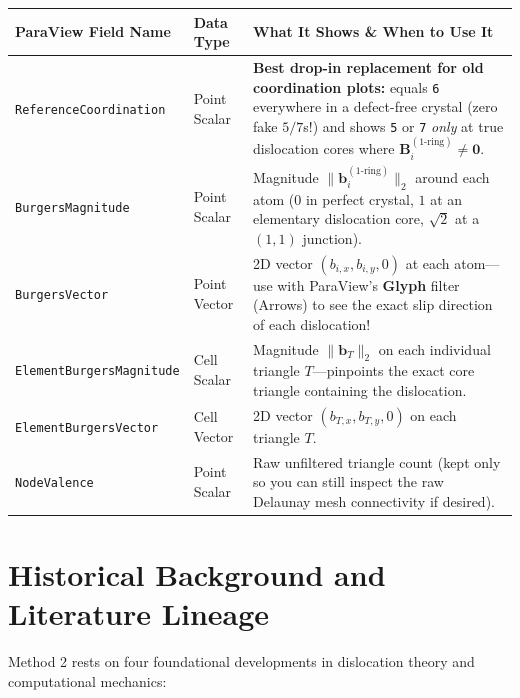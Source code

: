 \documentclass[11pt,a4paper]{article}
\newcommand{\code}[1]{\texttt{#1}}
\begin{document}
\begin{table}[htbp]
  \centering
  \small
  \renewcommand{\arraystretch}{1.25}
  \begin{tabular}{@{}llp{8.2cm}@{}}
    \toprule
    \textbf{ParaView Field Name} & \textbf{Data Type} & \textbf{What It Shows \& When to Use It} \\
    \midrule
    \code{ReferenceCoordination} & Point Scalar & \textbf{Best drop-in replacement for old coordination plots:} equals \code{6} everywhere in a defect-free crystal (zero fake $5/7$s!) and shows \code{5} or \code{7} \emph{only} at true dislocation cores where $\bm{B}_i^{(1\text{-ring})} \neq \bm{0}$. \\
    \code{BurgersMagnitude} & Point Scalar & Magnitude $\|\bm{b}_i^{(1\text{-ring})}\|_2$ around each atom ($0$ in perfect crystal, $1$ at an elementary dislocation core, $\sqrt{2}$ at a $(1,1)$ junction). \\
    \code{BurgersVector} & Point Vector & 2D vector $(b_{i,x}, b_{i,y}, 0)$ at each atom---use with ParaView's \textbf{Glyph} filter (Arrows) to see the exact slip direction of each dislocation! \\
    \code{ElementBurgersMagnitude} & Cell Scalar & Magnitude $\|\bm{b}_T\|_2$ on each individual triangle $T$---pinpoints the exact core triangle containing the dislocation. \\
    \code{ElementBurgersVector} & Cell Vector & 2D vector $(b_{T,x}, b_{T,y}, 0)$ on each triangle $T$. \\
    \code{NodeValence} & Point Scalar & Raw unfiltered triangle count (kept only so you can still inspect the raw Delaunay mesh connectivity if desired). \\
    \bottomrule
  \end{tabular}
\end{table}

\section{Historical Background and Literature Lineage}

Method 2 rests on four foundational developments in dislocation theory and computational mechanics:
\end{document}
